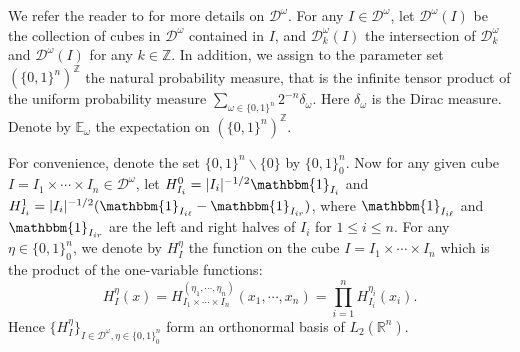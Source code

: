 \documentclass[oneside,english,a4wide]{amsart}
\numberwithin{equation}{section}
\numberwithin{figure}{section}
\theoremstyle{plain}
\theoremstyle{plain}
\theoremstyle{definition}
\theoremstyle{plain}
\theoremstyle{remark}
\theoremstyle{definition}
\theoremstyle{remark}
\theoremstyle{definition}
\newcommand{\8}{\infty}
\begin{document}
We refer the reader to \cite{TH2008} for more details on $\mathcal{D}^\omega$. For any $I\in\mathcal{ D}^\omega$, let $\mathcal{D}^\omega(I)$ be the collection of cubes in $\mathcal{D}^\omega$ contained in $I$, and $\mathcal{D}_k^\omega(I)$ the intersection of $\mathcal{D}_k^\omega$ and $\mathcal{D}^\omega(I)$ for any $k\in\mathbb{Z}$. In addition, we assign to the parameter set $(\{0,1\}^n)^\mathbb{Z}$ the natural probability measure, that is the infinite tensor product of the uniform probability measure $\sum\limits_{\omega\in \{0,1\}^n}2^{-n}\delta_{\omega}$. Here $\delta_{\omega}$ is the Dirac measure. Denote by $\mathbb{E}_\omega$ the expectation on $(\{0,1\}^n)^\mathbb{Z}$.

For convenience, denote the set $\{0,1\}^n\backslash \{0\}$ by $\{0,1\}^n_0$. Now for any given cube $I=I_1\times\cdots\times I_n\in\mathcal{D}^\omega$, let $H_{I_i}^0=|I_i|^{-1/2}\mathbbm{1}_{I_i}$ and $H_{I_i}^1=|I_i|^{-1/2}(\mathbbm{1}_{I_{i\ell}}-\mathbbm{1}_{I_{ir}})$, where $\mathbbm{1}_{I_{i\ell}}$ and $\mathbbm{1}_{I_{ir}}$ are the left and right halves of $I_i$ for $1\le i\le n$. For any $ \eta\in\{0,1\}^n_0$, we denote by $H_I^\eta$ the function on the cube $I=I_1\times\cdots\times I_n$ which is the product of the one-variable functions:
\[H_I^\eta(x)=H_{I_1\times\cdots\times I_n}^{(\eta_1,\cdots,\eta_n)}(x_1,\cdots,x_n)=\prod_{i=1}^nH_{I_i}^{\eta_i}(x_i).\]
Hence $\{H_I^\eta\}_{I\in\mathcal{D}^\omega,\eta\in\{0,1\}^n_0}$ form an orthonormal basis of $L_2(\mathbb{R}^n)$.

\
\end{document}
